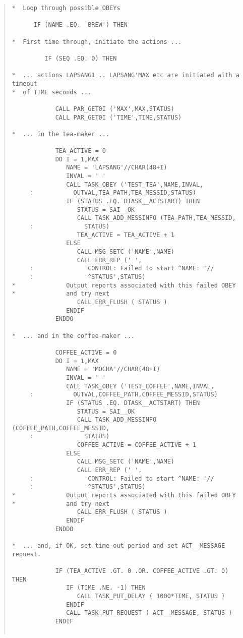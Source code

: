 \documentclass[twoside,11pt]{article}
\renewcommand{\_}{\texttt{\symbol{95}}}
\begin{document}
\begin{quote}
\begin{verbatim}
*  Loop through possible OBEYs
 
      IF (NAME .EQ. 'BREW') THEN
 
*  First time through, initiate the actions ...
 
         IF (SEQ .EQ. 0) THEN

*  ... actions LAPSANG1 .. LAPSANG'MAX etc are initiated with a timeout
*  of TIME seconds ...

            CALL PAR_GET0I ('MAX',MAX,STATUS)
            CALL PAR_GET0I ('TIME',TIME,STATUS)

*  ... in the tea-maker ...

            TEA_ACTIVE = 0
            DO I = 1,MAX
               NAME = 'LAPSANG'//CHAR(48+I)
               INVAL = ' '
               CALL TASK_OBEY ('TEST_TEA',NAME,INVAL,
     :           OUTVAL,TEA_PATH,TEA_MESSID,STATUS)
               IF (STATUS .EQ. DTASK__ACTSTART) THEN
                  STATUS = SAI__OK
                  CALL TASK_ADD_MESSINFO (TEA_PATH,TEA_MESSID,
     :              STATUS)
                  TEA_ACTIVE = TEA_ACTIVE + 1
               ELSE
                  CALL MSG_SETC ('NAME',NAME)
                  CALL ERR_REP (' ',
     :              'CONTROL: Failed to start ^NAME: '//
     :              '^STATUS',STATUS)
*              Output reports associated with this failed OBEY
*              and try next
                  CALL ERR_FLUSH ( STATUS )
               ENDIF
            ENDDO

*  ... and in the coffee-maker ...

            COFFEE_ACTIVE = 0
            DO I = 1,MAX
               NAME = 'MOCHA'//CHAR(48+I)
               INVAL = ' '
               CALL TASK_OBEY ('TEST_COFFEE',NAME,INVAL,
     :           OUTVAL,COFFEE_PATH,COFFEE_MESSID,STATUS)
               IF (STATUS .EQ. DTASK__ACTSTART) THEN
                  STATUS = SAI__OK
                  CALL TASK_ADD_MESSINFO (COFFEE_PATH,COFFEE_MESSID,
     :              STATUS)
                  COFFEE_ACTIVE = COFFEE_ACTIVE + 1
               ELSE
                  CALL MSG_SETC ('NAME',NAME)
                  CALL ERR_REP (' ',
     :              'CONTROL: Failed to start ^NAME: '//
     :              '^STATUS',STATUS)
*              Output reports associated with this failed OBEY
*              and try next
                  CALL ERR_FLUSH ( STATUS )
               ENDIF
            ENDDO
 
*  ... and, if OK, set time-out period and set ACT__MESSAGE request.
 
            IF (TEA_ACTIVE .GT. 0 .OR. COFFEE_ACTIVE .GT. 0) THEN
               IF (TIME .NE. -1) THEN
                  CALL TASK_PUT_DELAY ( 1000*TIME, STATUS )
               ENDIF
               CALL TASK_PUT_REQUEST ( ACT__MESSAGE, STATUS )
            ENDIF
 

\end{verbatim}
\end{quote}
\end{document}
